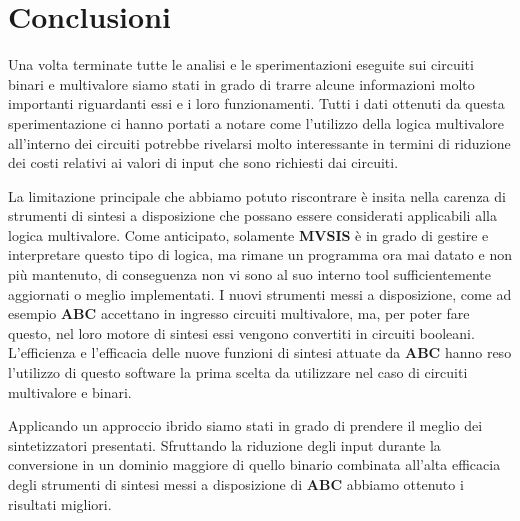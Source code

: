 \documentclass[
]{book}
\begin{document}
\hypertarget{conclusioni}{%
\chapter{Conclusioni}\label{conclusioni}}

Una volta terminate tutte le analisi e le sperimentazioni eseguite sui circuiti binari e multivalore siamo stati in grado di trarre alcune informazioni molto importanti riguardanti essi e i loro funzionamenti. Tutti i dati ottenuti da questa sperimentazione ci hanno portati a notare come l'utilizzo della logica multivalore all'interno dei circuiti potrebbe rivelarsi molto interessante in termini di riduzione dei costi relativi ai valori di input che sono richiesti dai circuiti.

La limitazione principale che abbiamo potuto riscontrare è insita nella carenza di strumenti di sintesi a disposizione che possano essere considerati applicabili alla logica multivalore. Come anticipato, solamente \textbf{MVSIS} è in grado di gestire e interpretare questo tipo di logica, ma rimane un programma ora mai datato e non più mantenuto, di conseguenza non vi sono al suo interno tool sufficientemente aggiornati o meglio implementati. I nuovi strumenti messi a disposizione, come ad esempio \textbf{ABC} accettano in ingresso circuiti multivalore, ma, per poter fare questo, nel loro motore di sintesi essi vengono convertiti in circuiti booleani. L'efficienza e l'efficacia delle nuove funzioni di sintesi attuate da \textbf{ABC} hanno reso l'utilizzo di questo software la prima scelta da utilizzare nel caso di circuiti multivalore e binari.

Applicando un approccio ibrido siamo stati in grado di prendere il meglio dei sintetizzatori presentati. Sfruttando la riduzione degli input durante la conversione in un dominio maggiore di quello binario combinata all'alta efficacia degli strumenti di sintesi messi a disposizione di \textbf{ABC} abbiamo ottenuto i risultati migliori.

\newpage
\end{document}
